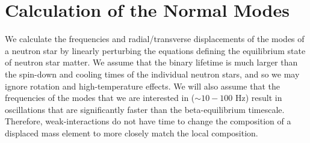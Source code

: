 \documentclass[fleqn,usenatbib]{mnras}
\begin{document}
\section{Calculation of the Normal Modes}
\hspace{\parindent}We calculate the frequencies and radial/transverse displacements of the modes of a neutron star by linearly perturbing the equations defining the equilibrium state of neutron star matter. We assume that the binary lifetime is much larger than the spin-down and cooling times of the individual neutron stars, and so we may ignore rotation and high-temperature effects. We will also assume that the frequencies of the modes that we are interested in ($\sim 10 - 100$ Hz) result in oscillations that are significantly faster than the beta-equilibrium timescale. Therefore, weak-interactions do not have time to change the composition of a displaced mass element to more closely match the local composition.%
\end{document}
